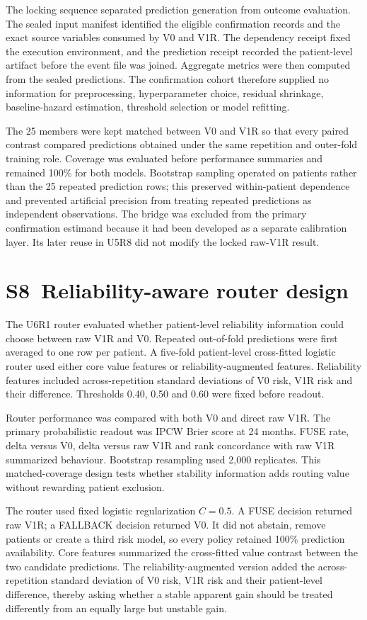 The locking sequence separated prediction generation from outcome evaluation. The sealed input manifest identified the eligible confirmation records and the exact source variables consumed by V0 and V1R. The dependency receipt fixed the execution environment, and the prediction receipt recorded the patient-level artifact before the event file was joined. Aggregate metrics were then computed from the sealed predictions. The confirmation cohort therefore supplied no information for preprocessing, hyperparameter choice, residual shrinkage, baseline-hazard estimation, threshold selection or model refitting.

The 25 members were kept matched between V0 and V1R so that every paired contrast compared predictions obtained under the same repetition and outer-fold training role. Coverage was evaluated before performance summaries and remained 100\% for both models. Bootstrap sampling operated on patients rather than the 25 repeated prediction rows; this preserved within-patient dependence and prevented artificial precision from treating repeated predictions as independent observations. The bridge was excluded from the primary confirmation estimand because it had been developed as a separate calibration layer. Its later reuse in U5R8 did not modify the locked raw-V1R result.

\section*{S8~Reliability-aware router design}
The U6R1 router evaluated whether patient-level reliability information could choose between raw V1R and V0. Repeated out-of-fold predictions were first averaged to one row per patient. A five-fold patient-level cross-fitted logistic router used either core value features or reliability-augmented features. Reliability features included across-repetition standard deviations of V0 risk, V1R risk and their difference. Thresholds 0.40, 0.50 and 0.60 were fixed before readout.

Router performance was compared with both V0 and direct raw V1R. The primary probabilistic readout was IPCW Brier score at 24 months. FUSE rate, delta versus V0, delta versus raw V1R and rank concordance with raw V1R summarized behaviour. Bootstrap resampling used 2,000 replicates. This matched-coverage design tests whether stability information adds routing value without rewarding patient exclusion.

The router used fixed logistic regularization $C=0.5$. A FUSE decision returned raw V1R; a FALLBACK decision returned V0. It did not abstain, remove patients or create a third risk model, so every policy retained 100\% prediction availability. Core features summarized the cross-fitted value contrast between the two candidate predictions. The reliability-augmented version added the across-repetition standard deviation of V0 risk, V1R risk and their patient-level difference, thereby asking whether a stable apparent gain should be treated differently from an equally large but unstable gain.

